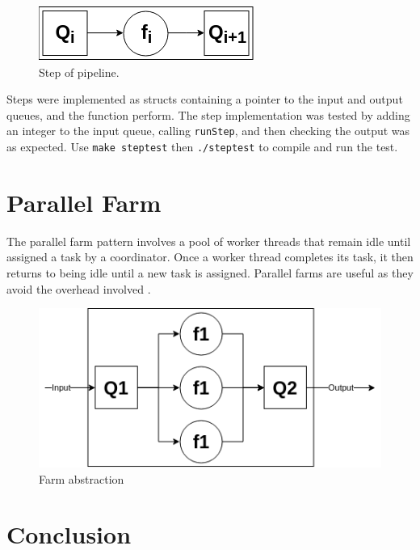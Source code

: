 \documentclass[12pt]{article}
\def\code#1{\texttt{#1}}
\begin{document}
\begin{figure}[!ht]
	\centering 
	\includegraphics[width=0.45\linewidth]{images/step}
	\caption{Step of pipeline.}
	\label{fig:step}
\end{figure}

Steps were implemented as structs containing a pointer to the input and output queues, and the function perform. The step implementation was tested by adding an integer to the input queue, calling \code{runStep}, and then checking the output was as expected. Use \code{make steptest} then \code{./steptest} to compile and run the test.

\section{Parallel Farm}

The parallel farm pattern involves a pool of worker threads that remain idle until assigned a task by a coordinator. Once a worker thread completes its task, it then returns to being idle until a new task is assigned. Parallel farms are useful as they avoid the overhead involved .

\begin{figure}[!ht]
	\centering 
	\includegraphics[width=0.8\linewidth]{images/farm}
	\caption{Farm abstraction}
	\label{fig:farm}
\end{figure}

\section*{Conclusion}

%
%
\end{document}
